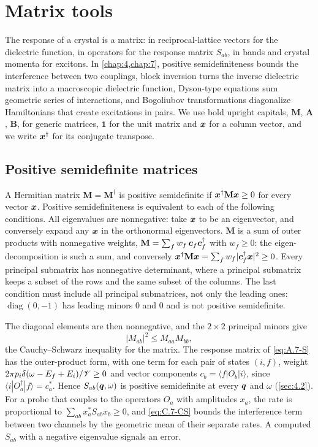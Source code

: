 \section{Matrix tools}\label{app:C.7}

The response of a crystal is a matrix: in reciprocal-lattice vectors for the dielectric function, in operators for the response matrix $S_{ab}$, in bands and crystal momenta for excitons. In \cref{chap:4,chap:7}, positive semidefiniteness bounds the interference between two couplings, block inversion turns the inverse dielectric matrix into a macroscopic dielectric function, Dyson-type equations sum geometric series of interactions, and Bogoliubov transformations diagonalize Hamiltonians that create excitations in pairs. We use bold upright capitals, $\mathbf{M}$, $\mathbf{A}$, $\mathbf{B}$, for generic matrices, $\mathbf{1}$ for the unit matrix and $\bm{x}$ for a column vector, and we write $\bm{x}^\dagger$ for its conjugate transpose.

\subsection{Positive semidefinite matrices}

A Hermitian matrix $\mathbf{M} = \mathbf{M}^\dagger$ is positive semidefinite if $\bm{x}^\dagger\mathbf{M}\bm{x} \ge 0$ for every vector $\bm{x}$. Positive semidefiniteness is equivalent to each of the following conditions. All eigenvalues are nonnegative: take $\bm{x}$ to be an eigenvector, and conversely expand any $\bm{x}$ in the orthonormal eigenvectors. $\mathbf{M}$ is a sum of outer products with nonnegative weights, $\mathbf{M} = \sum_fw_f\,\bm{c}_f\bm{c}_f^\dagger$ with $w_f \ge 0$: the eigen-decomposition is such a sum, and conversely $\bm{x}^\dagger\mathbf{M}\bm{x} = \sum_fw_f|\bm{c}_f^\dagger\bm{x}|^2 \ge 0$. Every principal submatrix has nonnegative determinant, where a principal submatrix keeps a subset of the rows and the same subset of the columns. The last condition must include all principal submatrices, not only the leading ones: $\operatorname{diag}(0, -1)$ has leading minors $0$ and $0$ and is not positive semidefinite.

The diagonal elements are then nonnegative, and the $2\times2$ principal minors give
\begin{equation}
  |M_{ab}|^2 \le M_{aa}M_{bb} ,
  \label{eq:C.7-CS}
\end{equation}
the Cauchy--Schwarz inequality for the matrix. The response matrix of \cref{eq:A.7-S} has the outer-product form, with one term for each pair of states $(i, f)$, weight $2\pi p_i\delta(\omega - E_f + E_i)/\mathscr{V} \ge 0$ and vector components $c_b = \langle f|O_b|i\rangle$, since $\langle i|O_a^\dagger|f\rangle = c_a^*$. Hence $S_{ab}(\bm{q},\omega)$ is positive semidefinite at every $\bm{q}$ and $\omega$ (\cref{sec:4.2}). For a probe that couples to the operators $O_a$ with amplitudes $x_a$, the rate is proportional to $\sum_{ab}x_a^*S_{ab}x_b \ge 0$, and \cref{eq:C.7-CS} bounds the interference term between two channels by the geometric mean of their separate rates. A computed $S_{ab}$ with a negative eigenvalue signals an error.

